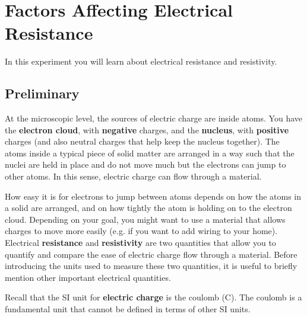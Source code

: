 \setcounter{chapter}{1}
\chapter{Factors Affecting Electrical Resistance}
%
In this experiment you will learn about electrical resistance and resistivity.
%
\section{Preliminary}
%
At the microscopic level, the sources of electric charge are inside atoms. You have the \textbf{electron cloud}, with \textbf{negative} charges, and the \textbf{nucleus}, with \textbf{positive} charges (and also neutral charges that help keep the nucleus together). The atoms inside a typical piece of solid matter are arranged in a way such that the nuclei are held in place and do not move much but the electrons can jump to other atoms. In this sense, electric charge can flow through a material.

How easy it is for electrons to jump between atoms depends on how the atoms in a solid are arranged, and on how tightly the atom is holding on to the electron cloud. Depending on your goal, you might want to use a material that allows charges to move more easily (e.g. if you want to add wiring to your home). Electrical \textbf{resistance} and \textbf{resistivity} are two quantities that allow you to quantify and compare the ease of electric charge flow through a material. Before introducing the units used to measure these two quantities, it is useful to briefly mention other important electrical quantities.

Recall that the SI unit for \textbf{electric charge} is the coulomb (C). The coulomb is a fundamental unit that cannot be defined in terms of other SI units.
%
